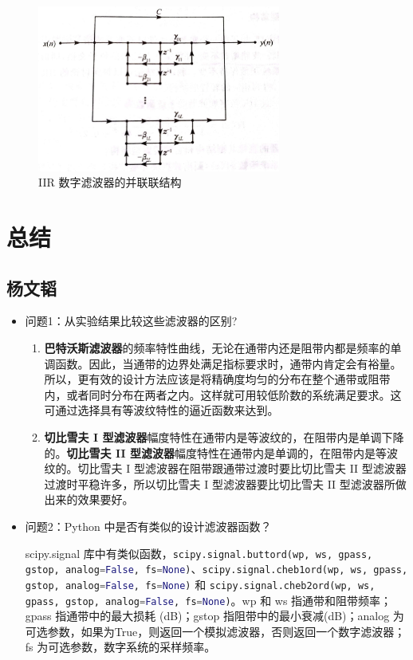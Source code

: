 \documentclass[12pt,AutoFakeBold]{article}
\begin{document}
\begin{figure}[hbtp]
	\centering
	\includegraphics[width=8cm]{figure/parallel.jpg}
	\caption{IIR 数字滤波器的并联联结构} \label{fig:parallel}
\end{figure}

\section{总结}

\subsection{杨文韬}

\begin{itemize}
\item 问题1：从实验结果比较这些滤波器的区别?

\begin{enumerate}[1.]
\item \textbf{巴特沃斯滤波器}的频率特性曲线，无论在通带内还是阻带内都是频率的单调函数。因此，当通带的边界处满足指标要求时，通带内肯定会有裕量。所以，更有效的设计方法应该是将精确度均匀的分布在整个通带或阻带内，或者同时分布在两者之内。这样就可用较低阶数的系统满足要求。这可通过选择具有等波纹特性的逼近函数来达到。
\item \textbf{切比雪夫 I 型滤波器}幅度特性在通带内是等波纹的，在阻带内是单调下降的。\textbf{切比雪夫 II 型滤波器}幅度特性在通带内是单调的，在阻带内是等波纹的。切比雪夫 I 型滤波器在阻带跟通带过渡时要比切比雪夫 II 型滤波器过渡时平稳许多，所以切比雪夫 I 型滤波器要比切比雪夫 II 型滤波器所做出来的效果要好。
\end{enumerate}

\item 问题2：Python 中是否有类似的设计滤波器函数？

scipy.signal 库中有类似函数，\lstinline[language=Python]|scipy.signal.buttord(wp, ws, gpass, gstop, analog=False, fs=None)|、\lstinline[language=Python]|scipy.signal.cheb1ord(wp, ws, gpass, gstop, analog=False, fs=None)| 和 \lstinline[language=Python]|scipy.signal.cheb2ord(wp, ws, gpass, gstop, analog=False, fs=None)|。wp 和 ws 指通带和阻带频率；gpass 指通带中的最大损耗 (dB)；gstop 指阻带中的最小衰减(dB)；analog 为可选参数，如果为True，则返回一个模拟滤波器，否则返回一个数字滤波器；fs 为可选参数，数字系统的采样频率。
\end{itemize}
\end{document}
